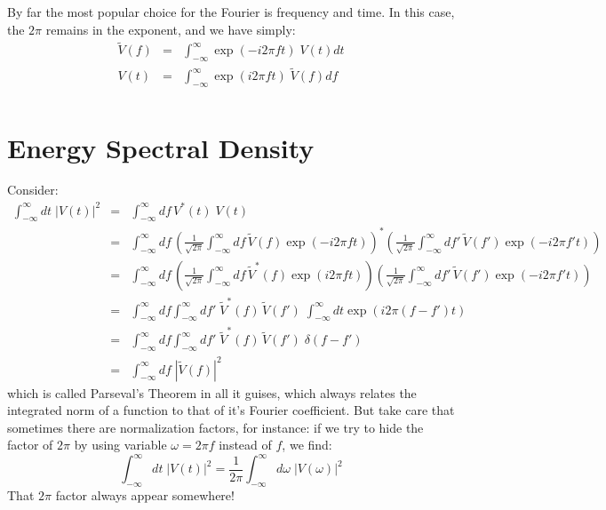 \documentclass[12pt]{article}
\begin{document}
By far the most popular choice for the Fourier is frequency and time.  In this case, the $2\pi$ remains in the exponent, and we have simply:
\begin{eqnarray}
\widetilde{V}(f) &=& \int^{\infty}_{-\infty}\exp(-i2\pi f t) \; V(t) dt \\
V(t) &=& \int^{\infty}_{-\infty}\exp(i2\pi f t) \; \widetilde{V}(f) df \\
\end{eqnarray}

\section{Energy Spectral Density}
Consider:
\begin{eqnarray*}
\int_{-\infty}^{\infty} dt \; |V(t)|^2 &=&  \int_{-\infty}^{\infty} df \, V^*(t) \; V(t) \\
&=& \int_{-\infty}^{\infty} df \, \left( \frac{1}{\sqrt{2\pi}} \int_{-\infty}^{\infty} df \, \widetilde{V}(f) \exp(-i2\pi f t) \right)^*  \left( \frac{1}{\sqrt{2\pi}} \int_{-\infty}^{\infty} df' \, \widetilde{V}(f') \exp(-i2\pi f' t) \right) \\
&=& \int_{-\infty}^{\infty} df \, \left( \frac{1}{\sqrt{2\pi}} \int_{-\infty}^{\infty} df \, \widetilde{V}^*(f) \exp(i2\pi f t) \right)  \left( \frac{1}{\sqrt{2\pi}} \int_{-\infty}^{\infty} df' \, \widetilde{V}(f') \exp(-i2\pi f' t) \right) \\
&=& \int_{-\infty}^{\infty} df \int_{-\infty}^{\infty} df'  \; \widetilde{V}^*(f) \, \widetilde{V}(f') 
\; \int_{-\infty}^{\infty} dt \exp(i2\pi(f-f')t)\\
&=& \int_{-\infty}^{\infty} df \int_{-\infty}^{\infty} df'  \; \widetilde{V}^*(f) \, \widetilde{V}(f') 
\; \delta(f-f')\\
&=& \int_{-\infty}^{\infty} df \; |\widetilde{V}(f)|^2
\end{eqnarray*}
which is called Parseval's Theorem in all it guises, which always relates the integrated norm of a function to that of it's Fourier coefficient.  But take care that sometimes there are normalization factors, for instance:
if we try to hide the factor of $2\pi$ by using variable $\omega = 2 \pi f$ instead of $f$, we find:
\begin{displaymath}
\int_{-\infty}^{\infty} dt \; |V(t)|^2 = \frac{1}{2\pi}\int_{-\infty}^{\infty} d\omega \; |V(\omega)|^2
\end{displaymath}
That $2\pi$ factor always appear somewhere!
\end{document}

